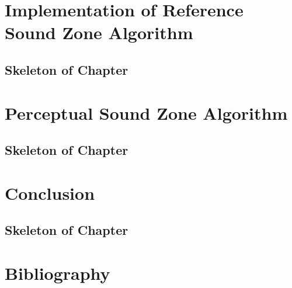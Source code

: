 \documentclass[11pt,twoside,openright,titlepage]{ce}
\begin{document}
\chapter{Implementation of Reference Sound Zone Algorithm}
\begin{tcolorbox}
\section*{Skeleton of Chapter}

\end{tcolorbox}
\newpage

\newpage

\newpage

\newpage


\chapter{Perceptual Sound Zone Algorithm}
\begin{tcolorbox}
\section*{Skeleton of Chapter}

\end{tcolorbox}
\newpage


\chapter{Conclusion}
\begin{tcolorbox}
\section*{Skeleton of Chapter}
\newpage

\end{tcolorbox}

\chapter{Bibliography}



\appendix
\end{document}
